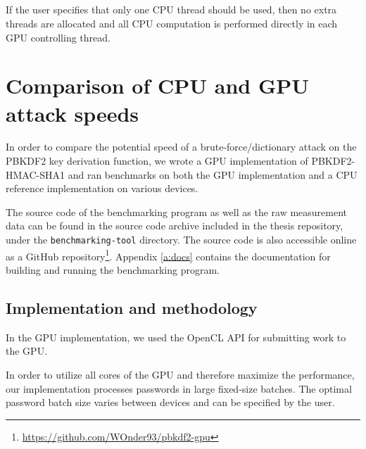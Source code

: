 \documentclass[12pt,oneside]{fithesis2}
\begin{document}
      \paragraph*{}
      If the user specifies that only one CPU thread should be used, then no extra threads are allocated and all CPU computation is performed directly in each GPU controlling thread.
      
    \chapter{Comparison of CPU and GPU attack speeds}
      In order to compare the potential speed of a brute-force/dictionary attack on the PBKDF2 key derivation function, we wrote a GPU implementation of PBKDF2-HMAC-SHA1 and ran benchmarks on both the GPU implementation and a CPU reference implementation on various devices.
      
      The source code of the benchmarking program as well as the raw measurement data can be found in the source code archive included in the thesis repository, under the \texttt{benchmarking-tool} directory. The source code is also accessible online as a GitHub repository\footnote{\url{https://github.com/WOnder93/pbkdf2-gpu}}. Appendix \ref{a:docs} contains the documentation for building and running the benchmarking program.
      
      \section{Implementation and methodology}
      In the GPU implementation, we used the OpenCL API for submitting work to the GPU.
      
      In order to utilize all cores of the GPU and therefore maximize the performance, our implementation processes passwords in large fixed-size batches. The optimal password batch size varies between devices and can be specified by the user.
      
\end{document}
